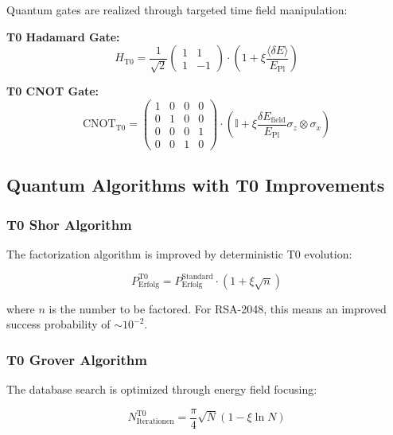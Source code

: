 \documentclass[12pt,a4paper]{article}
\newcommand{\Efield}{E_{\text{field}}}
\newcommand{\xipar}{\xi}
\newcommand{\deltaE}{\delta E}
\newcommand{\EPlanck}{E_{\text{Pl}}}
\begin{document}
	Quantum gates are realized through targeted time field manipulation:
	
	\textbf{T0 Hadamard Gate:}
	\begin{equation}
		H_{\text{T0}} = \frac{1}{\sqrt{2}}\begin{pmatrix} 1 & 1 \\ 1 & -1 \end{pmatrix} \cdot \left(1 + \xipar \frac{\langle\deltaE\rangle}{\EPlanck}\right)
	\end{equation}
	
	\textbf{T0 CNOT Gate:}
	\begin{equation}
		\text{CNOT}_{\text{T0}} = \begin{pmatrix} 1 & 0 & 0 & 0 \\ 0 & 1 & 0 & 0 \\ 0 & 0 & 0 & 1 \\ 0 & 0 & 1 & 0 \end{pmatrix} \cdot \left(\mathbb{I} + \xipar \frac{\delta\Efield}{\EPlanck} \sigma_z \otimes \sigma_x\right)
	\end{equation}
	
	\subsection{Quantum Algorithms with T0 Improvements}
	
	\subsubsection{T0 Shor Algorithm}
	
	The factorization algorithm is improved by deterministic T0 evolution:
	
	\begin{equation}
		P_{\text{Erfolg}}^{\text{T0}} = P_{\text{Erfolg}}^{\text{Standard}} \cdot \left(1 + \xipar \sqrt{n}\right)
	\end{equation}
	
	where $n$ is the number to be factored. For RSA-2048, this means an improved success probability of $\sim 10^{-2}$.
	
	\subsubsection{T0 Grover Algorithm}
	
	The database search is optimized through energy field focusing:
	
	\begin{equation}
		N_{\text{Iterationen}}^{\text{T0}} = \frac{\pi}{4}\sqrt{N} \left(1 - \xipar \ln N\right)
	\end{equation}
	
\end{document}

